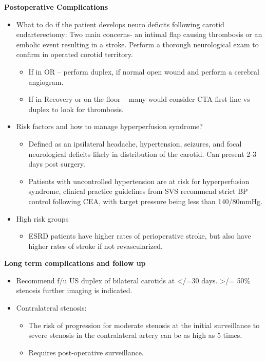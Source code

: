 \documentclass[
]{book}
\providecommand{\tightlist}{%
  \setlength{\itemsep}{0pt}\setlength{\parskip}{0pt}}
\begin{document}
\textbf{Postoperative Complications}

\begin{itemize}
\item
  What to do if the patient develops neuro deficits following carotid
  endarterectomy: Two main concerns- an intimal flap causing
  thrombosis or an embolic event resulting in a stroke. Perform a
  thorough neurological exam to confirm in operated corotid territory.

  \begin{itemize}
  \item
    If in OR -- perform duplex, if normal open wound and perform a
    cerebral angiogram.
  \item
    If in Recovery or on the floor -- many would consider CTA first
    line vs duplex to look for thrombosis.
  \end{itemize}
\item
  Risk factors and how to manage hyperperfusion syndrome?

  \begin{itemize}
  \item
    Defined as an ipsilateral headache, hypertension, seizures, and
    focal neurological deficits likely in distribution of the
    carotid. Can present 2-3 days post surgery.
  \item
    Patients with uncontrolled hypertension are at risk for
    hyperperfusion syndrome, clinical practice guidelines from SVS
    recommend strict BP control following CEA, with target pressure
    being less than 140/80mmHg.
  \end{itemize}
\item
  High risk groups

  \begin{itemize}
  \tightlist
  \item
    ESRD patients have higher rates of perioperative stroke, but
    also have higher rates of stroke if not revascularized.
    \citep{klarinPerioperativeLongtermImpact2016}
  \end{itemize}
\end{itemize}

\textbf{Long term complications and follow up}

\begin{itemize}
\item
  Recommend f/u US duplex of bilateral carotids at \textless/=30 days. \textgreater/=
  50\% stenosis further imaging is indicated.
\item
  Contralateral stenosis:

  \begin{itemize}
  \item
    The risk of progression for moderate stenosis at the initial
    surveillance to severe stenosis in the contralateral artery can
    be as high as 5 times.
  \item
    Requires post-operative surveillance.
  \end{itemize}
\end{itemize}
\end{document}
